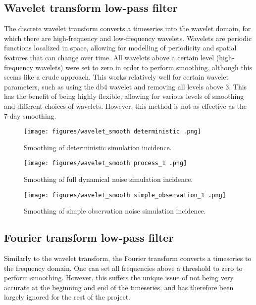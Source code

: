 \documentclass{article}
\begin{document}
\subsection{Wavelet transform low-pass filter}
The discrete wavelet transform converts a timeseries into the wavelet domain, for which there are high-frequency and low-frequency wavelets. Wavelets are periodic functions localized in space, allowing for modelling of periodicity and spatial features that can change over time. All wavelets above a certain level (high-frequency wavelets) were set to zero in order to perform smoothing, although this seems like a crude approach. This works relatively well for certain wavelet parameters, such as using the db4 wavelet and removing all levels above 3. This has the benefit of being highly flexible, allowing for various levels of smoothing and different choices of wavelets. However, this method is not as effective as the 7-day smoothing.

\clearpage
\begin{figure}[h!]
    \centering
    \texttt{[image: figures/wavelet\_smooth deterministic .png]}
    \caption{Smoothing of deterministic simulation incidence.}
\end{figure}


\clearpage
\begin{figure}[h!]
    \centering
    \texttt{[image: figures/wavelet\_smooth process\_1 .png]}
    \caption{Smoothing of full dynamical noise simulation incidence.}
\end{figure}

\clearpage
\begin{figure}[h!]
    \centering
    \texttt{[image: figures/wavelet\_smooth simple\_observation\_1 .png]}
    \caption{Smoothing of simple observation noise simulation incidence.}
\end{figure}



\subsection{Fourier transform low-pass filter}
Similarly to the wavelet transform, the Fourier transform converts a timeseries to the frequency domain. One can set all frequencies above a threshold to zero to perform smoothing. However, this suffers the unique issue of not being very accurate at the beginning and end of the timeseries, and has therefore been largely ignored for the rest of the project.
\end{document}
